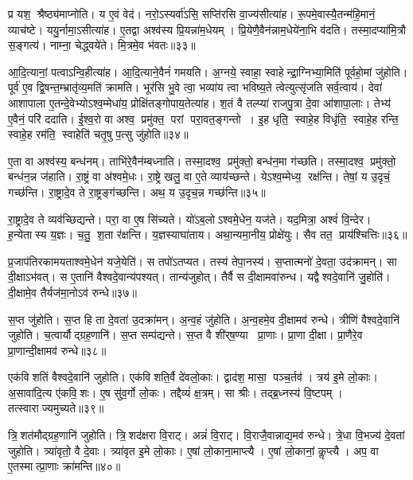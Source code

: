 प्र यश॒ श्रैष्ठ्य॑माप्नोति।
य ए॒वं वेद॑।
नरो॒ऽस्यर्वा॑ऽसि॒ सप्ति॑रसि वा॒ज्य॑सीत्या॑ह।
रू॒पमे॒वास्यै॒तन्म॑हि॒मानं॒ व्याच॑ष्टे।
ययु॒र्नामा॒ऽसीत्या॑ह।
ए॒तद्वा अश्व॑स्य प्रि॒यन्ना॑म॒धेयम्।
प्रि॒येणै॒वैन॑न्नाम॒धेये॑ना॒भि व॑दति।
तस्मा॒दप्या॑मि॒त्रौ स॒ङ्गत्य॑।
नाम्ना॒ चेद्ध्वये॑ते।
मि॒त्रमे॒व भ॑वतः॥३३॥

आ॒दि॒त्यानां॒ पत्वाऽन्वि॒हीत्या॑ह।
आ॒दि॒त्याने॒वैनं॑ गमयति।
अ॒ग्नये॒ स्वाहा॒ स्वाहेन्द्रा॒ग्निभ्या॒मिति॑ पूर्वहो॒मां जु॑होति।
पूर्व॑ ए॒व द्वि॒षन्त॒म्भ्रातृ॑व्य॒मति॑ क्रामति।
भूर॑सि भु॒वे त्वा॒ भव्या॑य त्वा भविष्य॒ते त्वेत्युत्सृ॑जति सर्व॒त्वाय॑।
देवा॑ आशापाला ए॒तन्दे॒वेभ्योऽश्व॒म्मेधा॑य॒ प्रोक्षि॑तङ्गोपाय॒तेत्या॑ह।
श॒तं वै तल्प्या॑ राजपु॒त्रा दे॒वा आ॑शापा॒लाः।
तेभ्य॑ ए॒वैनं॒ परि॑ ददाति।
ई॒श्व॒रो वा अश्व॒ प्रमु॑क्त॒ परां परा॒वत॒ङ्गन्तो।
इ॒ह धृति॒ स्वाहे॒ह विधृ॑ति॒ स्वाहे॒ह रन्ति॒ स्वाहे॒ह रम॑ति॒ स्वाहेति॑ चतृ॒षु प॒त्सु जु॑होति॥३४॥

ए॒ता वा अश्व॑स्य॒ बन्ध॑नम्।
ताभि॑रे॒वैन॑म्बध्नाति।
तस्मा॒दश्व॒ प्रमु॑क्तो॒ बन्ध॑न॒मा ग॑च्छति।
तस्मा॒दश्व॒ प्रमु॑क्तो॒ बन्ध॑न॒न्न ज॑हाति।
रा॒ष्ट्रं वा अ॑श्वमे॒धः।
रा॒ष्ट्रे खलु॒ वा ए॒ते व्याय॑च्छन्ते।
येऽश्व॒म्मेध्य॒ रक्ष॑न्ति।
तेषां॒ य उ॒दृचं॒ गच्छ॑न्ति।
रा॒ष्ट्रादे॒व ते रा॒ष्ट्रङ्ग॑च्छन्ति।
अथ॒ य उ॒दृच॒न्न गच्छ॑न्ति॥३५॥

रा॒ष्ट्रादे॒व ते व्यव॑च्छिद्यन्ते।
परा॒ वा ए॒ष सि॑च्यते।
यो॑ऽब॒लोऽश्वमे॒धेन॒ यज॑ते।
यद॒मित्रा॒ अश्वं॑ वि॒न्देर\sn{}।
ह॒न्येतास्य य॒ज्ञः।
च॒तु॒ श॒ता र॑क्षन्ति।
य॒ज्ञस्याघा॑ताय।
अथा॒न्यमा॒नीय॒ प्रोक्षे॑युः।
सैव तत॒ प्राय॑श्चित्तिः॥३६॥\anuvakamend[ग॒च्छ॒ति॒ भ॒व॒त॒ प॒त्सु जु॑होति॒ न गच्छ॑न्ति॒ नव॑ च]

प्र॒जाप॑तिरकामयताश्वमे॒धेन॑ यजे॒येति॑।
स तपो॑ऽतप्यत।
तस्य॑ तेपा॒नस्य॑।
स॒प्तात्मनो॑ दे॒वता॒ उद॑क्रामन्।
सा दी॒क्षाऽभ॑वत्।
स ए॒तानि॑ वैश्वदे॒वान्य॑पश्यत्।
तान्य॑जुहोत्।
तैर्वै स दी॒क्षामवा॑रुन्ध।
यद्वैश्वदे॒वानि॑ जु॒होति॑।
दी॒क्षामे॒व तैर्यज॑मा॒नोऽव॑ रुन्धे॥३७॥

स॒प्त जु॑होति।
स॒प्त हि ता दे॒वता॑ उ॒दक्रा॑मन्।
अ॒न्व॒हं जु॑होति।
अ॒न्व॒हमे॒व दी॒क्षामव॑ रुन्धे।
त्रीणि॑ वैश्वदे॒वानि॑ जुहोति।
च॒त्वार्यौद्ग्रह॒णानि॑।
स॒प्त सम्प॑द्यन्ते।
स॒प्त वै शी॑र्‌ष॒ण्या प्रा॒णाः।
प्रा॒णा दी॒क्षा।
प्रा॒णैरे॒व प्रा॒णान्दी॒क्षामव॑ रुन्धे॥३८॥

एक॑विशतिं वैश्वदे॒वानि॑ जुहोति।
एक॑विशति॒र्वै दे॑वलो॒काः।
द्वाद॑श॒ मासा॒ पञ्च॒र्तव॑।
त्रय॑ इ॒मे लो॒काः।
अ॒सावा॑दि॒त्य ए॑कवि॒शः।
ए॒ष सु॑व॒र्गो लो॒कः।
तद्दैव्यं॑ क्ष॒त्रम्।
सा श्रीः।
तद्ब्र॒ध्नस्य॑ वि॒ष्टपम्।
तत्स्वाराज्यमुच्यते॥३९॥

त्रि॒शत॑मौद्ग्रह॒णानि॑ जुहोति।
त्रि॒शद॑क्षरा वि॒राट्।
अन्नं॑ वि॒राट्।
वि॒राजै॒वान्नाद्य॒मव॑ रुन्धे।
त्रे॒धा वि॒भज्य॑ दे॒वतां जुहोति।
त्र्या॑वृतो॒ वै दे॒वाः।
त्र्या॑वृत इ॒मे लो॒काः।
ए॒षां लो॒काना॒माप्त्यै।
ए॒षां लो॒कानां॒ कॢप्त्यै।
अप॒ वा ए॒तस्मात्प्रा॒णाः क्रा॑मन्ति॥४०॥

